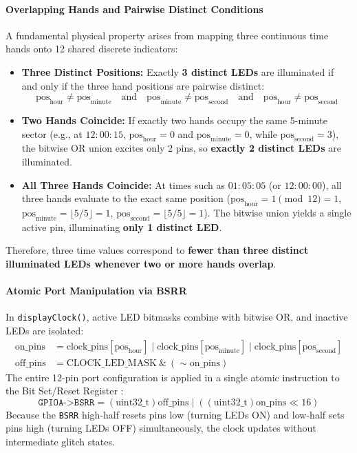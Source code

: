 \documentclass[oneside,final]{hcmut-report}
\begin{document}
\paragraph{Overlapping Hands and Pairwise Distinct Conditions}
A fundamental physical property arises from mapping three continuous time hands onto 12 shared discrete indicators:
\begin{itemize}[leftmargin=*,itemsep=0pt,topsep=1pt,partopsep=0pt,parsep=0pt]
  \item \textbf{Three Distinct Positions:} Exactly \textbf{3 distinct LEDs} are illuminated if and only if the three hand positions are pairwise distinct:
  \begin{equation}
    \text{pos}_{\text{hour}} \ne \text{pos}_{\text{minute}} \quad \text{and} \quad \text{pos}_{\text{minute}} \ne \text{pos}_{\text{second}} \quad \text{and} \quad \text{pos}_{\text{hour}} \ne \text{pos}_{\text{second}}
  \end{equation}
  \item \textbf{Two Hands Coincide:} If exactly two hands occupy the same 5-minute sector (e.g., at $12:00:15$, $\text{pos}_{\text{hour}} = 0$ and $\text{pos}_{\text{minute}} = 0$, while $\text{pos}_{\text{second}} = 3$), the bitwise OR union excites only 2 pins, so \textbf{exactly 2 distinct LEDs} are illuminated.
  \item \textbf{All Three Hands Coincide:} At times such as \textbf{$01:05:05$} (or $12:00:00$), all three hands evaluate to the exact same position ($\text{pos}_{\text{hour}} = 1 \pmod{12} = 1$, $\text{pos}_{\text{minute}} = \lfloor 5/5 \rfloor = 1$, $\text{pos}_{\text{second}} = \lfloor 5/5 \rfloor = 1$). The bitwise union yields a single active pin, illuminating \textbf{only 1 distinct LED}.
\end{itemize}
\noindent Therefore, three time values correspond to \textbf{fewer than three distinct illuminated LEDs whenever two or more hands overlap}.

\paragraph{Atomic Port Manipulation via BSRR}
In \texttt{displayClock()}, active LED bitmasks combine with bitwise OR, and inactive LEDs are isolated:
\begin{align}
  \text{on\_pins} &= \text{clock\_pins}[\text{pos}_{\text{hour}}] \mid \text{clock\_pins}[\text{pos}_{\text{minute}}] \mid \text{clock\_pins}[\text{pos}_{\text{second}}] \\
  \text{off\_pins} &= \text{CLOCK\_LED\_MASK} \ \& \ (\sim\text{on\_pins})
\end{align}
The entire 12-pin port configuration is applied in a single atomic instruction to the Bit Set/Reset Register \cite{rm0008}:
\begin{equation}
  \texttt{GPIOA->BSRR} = (\text{uint32\_t})\text{off\_pins} \mid ((\text{uint32\_t})\text{on\_pins} \ll 16)
\end{equation}
Because the \texttt{BSRR} high-half resets pins low (turning LEDs ON) and low-half sets pins high (turning LEDs OFF) simultaneously, the clock updates without intermediate glitch states.
\end{document}
